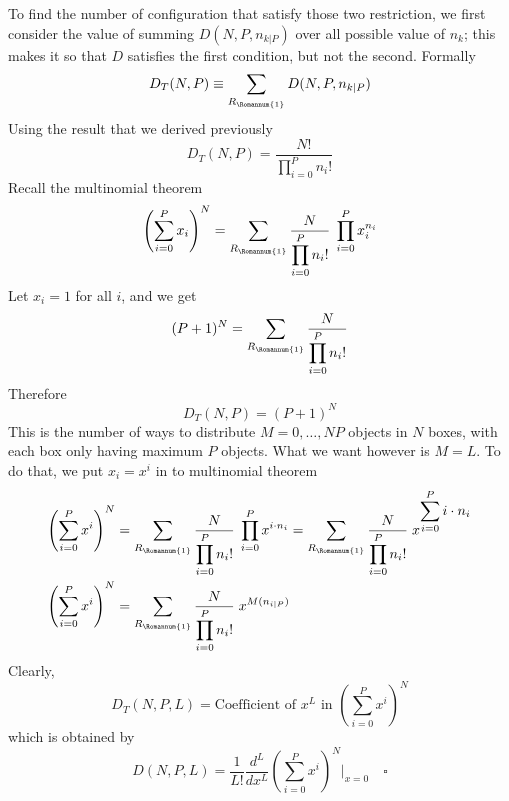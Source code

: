 \documentclass[../../main.tex]{subfiles}
\begin{document}
To find the number of configuration that satisfy those two restriction, we first consider the value of summing $D(N,P,n_{k|P})$ over all possible value of $n_k$; this makes it so that $D$ satisfies the first condition, but not the second. Formally 
\begin{equation*}
    D_T(N,P)\equiv \sum_{R_\Romannum{1}}D(N,P,n_{k|P})
\end{equation*}
Using the result that we derived previously 
\begin{equation*}
    D_T(N,P)= \frac{N!}{\displaystyle\prod_{i=0}^{P}n_i!}
\end{equation*}
Recall the multinomial theorem
\begin{equation*}
    \left(\sum_{i=0 }^{P}x_i\right)^N=\sum_{R_\Romannum{1}}^{}\frac{N}{\displaystyle\prod_{i=0}^{P}n_i!} \; \prod_{i=0}^{P}x_{i}^{n_{i}}
\end{equation*}
Let $x_i=1$ for all $i$, and we get 
\begin{equation*}
    (P+1)^N=\sum_{R_\Romannum{1}}^{}\frac{N}{\displaystyle\prod_{i=0}^{P}n_i!} 
\end{equation*}
Therefore 
\begin{equation*}
    D_T(N,P)=(P+1)^N
\end{equation*}
This is the number of ways to distribute $M=0,\dots, NP$ objects in $N$ boxes, with each box only having maximum $P$ objects. What we want however is $M=L$. To do that, we put $x_i=x^i$ in to multinomial theorem
\begin{align*}
    \left(\sum_{i=0 }^{P}x^i\right)^N&=\sum_{R_\Romannum{1}}^{}\frac{N}{\displaystyle\prod_{i=0}^{P}n_i!} \; \prod_{i=0}^{P}x^{i\cdot n_{i}}
    =\sum_{R_\Romannum{1}}^{}\frac{N}{\displaystyle\prod_{i=0}^{P}n_i!} \; x^{\displaystyle\sum_{i=0}^{P}i\cdot n_{i}}\\
    \left(\sum_{i=0 }^{P}x^i\right)^N&=\sum_{R_\Romannum{1}}^{}\frac{N}{\displaystyle\prod_{i=0}^{P}n_i!} \; x^{M(n_{i|P})}
\end{align*}
Clearly,
\begin{equation*}
    D_T(N,P,L)=\text{Coefficient of $x^L$ in } \left(\sum_{i=0 }^{P}x^i\right)^N
\end{equation*}
which is obtained by 
\begin{equation*}
    D(N,P,L)=\frac{1}{L!}\frac{d^L}{dx^L}\left(\sum_{i=0 }^{P}x^i\right)^N \bigg|_{x=0}\quad\square
\end{equation*}
\end{document}
